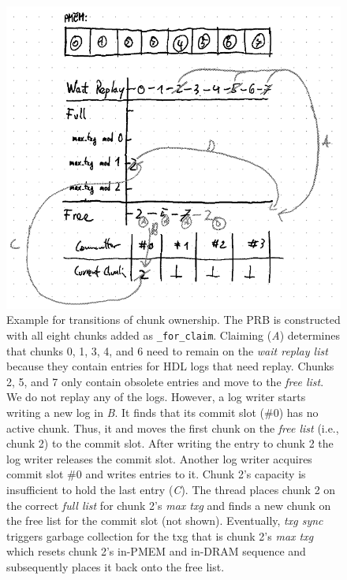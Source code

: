 \documentclass[12pt,a4paper,twoside]{book}
\begin{document}
{\begin{figure}[H]
    \centering
    \includegraphics{fig/prb_chunk_ownership_cycle__example}
    \caption{
        Example for transitions of chunk ownership.
        The PRB is constructed with all eight chunks added as \lstinline{_for_claim}.
        Claiming (\textit{A}) determines that chunks 0, 1, 3, 4, and 6 need to remain on the \textit{wait replay list} because they contain entries for HDL logs that need replay.
        Chunks 2, 5, and 7 only contain obsolete entries and move to the \textit{free list}.
        We do not replay any of the logs.
        However, a log writer starts writing a new log in \textit{B}.
        It finds that its commit slot (\#0) has no active chunk.
        Thus, it and moves the first chunk on the \textit{free list} (i.e., chunk 2) to the commit slot.
        After writing the entry to chunk 2 the log writer releases the commit slot.
        Another log writer acquires commit slot \#0 and writes entries to it.
        Chunk 2's capacity is insufficient to hold the last entry (\textit{C}).
        The thread places chunk 2 on the correct \textit{full list} for chunk 2's \textit{max txg} and finds a new chunk on the free list for the commit slot (not shown).
        Eventually, \textit{txg sync} triggers garbage collection for the txg that is chunk 2's \textit{max txg} which resets chunk 2's in-PMEM and in-DRAM sequence and subsequently places it back onto the free list.
    }
    \label{fig:prb_chunk_ownership_cycle__example}
\end{figure}

}
\end{document}
